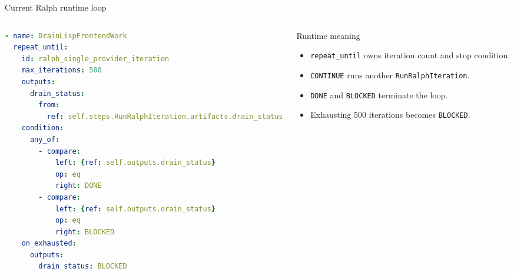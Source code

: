 \documentclass[aspectratio=169]{beamer}
\begin{document}
\begin{frame}[fragile,shrink=7]{Current Ralph runtime loop}
\begin{columns}[T,totalwidth=\textwidth]
\begin{column}{0.58\textwidth}
\begin{lstlisting}[language=yaml,basicstyle=\ttfamily\tiny]
- name: DrainLispFrontendWork
  repeat_until:
    id: ralph_single_provider_iteration
    max_iterations: 500
    outputs:
      drain_status:
        from:
          ref: self.steps.RunRalphIteration.artifacts.drain_status
    condition:
      any_of:
        - compare:
            left: {ref: self.outputs.drain_status}
            op: eq
            right: DONE
        - compare:
            left: {ref: self.outputs.drain_status}
            op: eq
            right: BLOCKED
    on_exhausted:
      outputs:
        drain_status: BLOCKED
\end{lstlisting}
\end{column}
\begin{column}{0.38\textwidth}
\begin{block}{Runtime meaning}
\begin{itemize}
  \item \texttt{repeat\_until} owns iteration count and stop condition.
  \item \texttt{CONTINUE} runs another \texttt{RunRalphIteration}.
  \item \texttt{DONE} and \texttt{BLOCKED} terminate the loop.
  \item Exhausting 500 iterations becomes \texttt{BLOCKED}.
\end{itemize}
\end{block}
\end{column}
\end{columns}
\end{frame}
\end{document}
